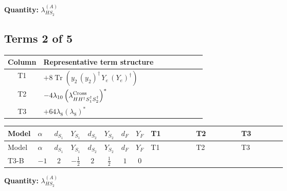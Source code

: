 \documentclass[8pt]{article}
\begin{document}
\begin{landscape}
\begin{longtable}{@{}llcccccc >{\raggedright\arraybackslash}p{0.21\linewidth} >{\raggedright\arraybackslash}p{0.21\linewidth} >{\raggedright\arraybackslash}p{0.21\linewidth}@{}}
\midrule
\bottomrule
\end{longtable}
\clearpage
\noindent\textbf{Quantity: }$\lambda_{HS_2}^{(A)}$\par\smallskip
\subsection*{Terms 2 of 5}
\begin{center}
\begin{tabular}{@{}c >{\raggedright\arraybackslash}p{0.82\linewidth}@{}}
\toprule
Column & Representative term structure \\
\midrule
T1 & \(\displaystyle +8 \operatorname{Tr}\!\left({y_2}\,\left({y_2}\right)^{\dagger}\,{Y_e}\,\left({Y_e}\right)^{\dagger}\right)\) \\
\midrule
T2 & \(\displaystyle -4 {\lambda_{10}} \left({\lambda_{H H^\dagger S_1^\dagger S_2^\dagger}^{\rm Cross}}\right)^{*}\) \\
\midrule
T3 & \(\displaystyle +64 {\lambda_{8}} \left({\lambda_{8}}\right)^{*}\) \\
\midrule
\bottomrule
\end{tabular}
\end{center}
\smallskip
\tiny
\begin{longtable}{@{}llcccccc >{\raggedright\arraybackslash}p{0.21\linewidth} >{\raggedright\arraybackslash}p{0.21\linewidth} >{\raggedright\arraybackslash}p{0.21\linewidth}@{}}
\toprule
Model & $\alpha$ & $d_{S_1}$ & $Y_{S_1}$ & $d_{S_2}$ & $Y_{S_2}$ & $d_F$ & $Y_F$ & T1 & T2 & T3 \\
\midrule
\endfirsthead
\toprule
Model & $\alpha$ & $d_{S_1}$ & $Y_{S_1}$ & $d_{S_2}$ & $Y_{S_2}$ & $d_F$ & $Y_F$ & T1 & T2 & T3 \\
\midrule
\endhead
T3-B & $-1$ & $2$ & $-\frac{1}{2}$ & $2$ & $\frac{1}{2}$ & $1$ & $0$ & \scriptsize\adjustbox{max width=\linewidth}{$\begin{gathered} +8 \operatorname{Tr}\!\left({y_2}\,\left({y_2}\right)^{\dagger}\,{Y_e}\,\left({Y_e}\right)^{\dagger}\right)\end{gathered}$} & \scriptsize\adjustbox{max width=\linewidth}{$\begin{gathered} -4 {\lambda_{10}} \left({\lambda_{H H^\dagger S_1^\dagger S_2^\dagger}^{\rm Cross}}\right)^{*}\end{gathered}$} & \scriptsize\adjustbox{max width=\linewidth}{$\begin{gathered} +64 {\lambda_{8}} \left({\lambda_{8}}\right)^{*}\end{gathered}$} \\
\midrule
\bottomrule
\end{longtable}
\clearpage
\noindent\textbf{Quantity: }$\lambda_{HS_2}^{(A)}$\par\smallskip

\end{landscape}
\end{document}
